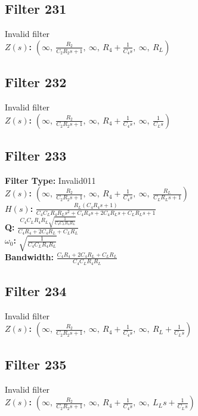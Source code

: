 \documentclass{article}
\begin{document}
\subsection*{Filter 231}
Invalid filter \\ 
\textbf{$Z(s)$:} $\left( \infty, \  \frac{R_{2}}{C_{2} R_{2} s + 1}, \  \infty, \  R_{4} + \frac{1}{C_{4} s}, \  \infty, \  R_{L}\right)$ \\ 
\subsection*{Filter 232}
Invalid filter \\ 
\textbf{$Z(s)$:} $\left( \infty, \  \frac{R_{2}}{C_{2} R_{2} s + 1}, \  \infty, \  R_{4} + \frac{1}{C_{4} s}, \  \infty, \  \frac{1}{C_{L} s}\right)$ \\ 
\subsection*{Filter 233}
\textbf{Filter Type:} Invalid011 \\ 
\textbf{$Z(s)$:} $\left( \infty, \  \frac{R_{2}}{C_{2} R_{2} s + 1}, \  \infty, \  R_{4} + \frac{1}{C_{4} s}, \  \infty, \  \frac{R_{L}}{C_{L} R_{L} s + 1}\right)$ \\ 
\textbf{$H(s)$:} $\frac{R_{L} \left(C_{4} R_{4} s + 1\right)}{C_{4} C_{L} R_{4} R_{L} s^{2} + C_{4} R_{4} s + 2 C_{4} R_{L} s + C_{L} R_{L} s + 1}$ \\ 
\textbf{Q:} $\frac{C_{4} C_{L} R_{4} R_{L} \sqrt{\frac{1}{C_{4} C_{L} R_{4} R_{L}}}}{C_{4} R_{4} + 2 C_{4} R_{L} + C_{L} R_{L}}$ \\ 
\textbf{$\omega_0$:} $\sqrt{\frac{1}{C_{4} C_{L} R_{4} R_{L}}}$ \\ 
\textbf{Bandwidth:} $\frac{C_{4} R_{4} + 2 C_{4} R_{L} + C_{L} R_{L}}{C_{4} C_{L} R_{4} R_{L}}$ \\ 
\subsection*{Filter 234}
Invalid filter \\ 
\textbf{$Z(s)$:} $\left( \infty, \  \frac{R_{2}}{C_{2} R_{2} s + 1}, \  \infty, \  R_{4} + \frac{1}{C_{4} s}, \  \infty, \  R_{L} + \frac{1}{C_{L} s}\right)$ \\ 
\subsection*{Filter 235}
Invalid filter \\ 
\textbf{$Z(s)$:} $\left( \infty, \  \frac{R_{2}}{C_{2} R_{2} s + 1}, \  \infty, \  R_{4} + \frac{1}{C_{4} s}, \  \infty, \  L_{L} s + \frac{1}{C_{L} s}\right)$ \\ 
\end{document}
